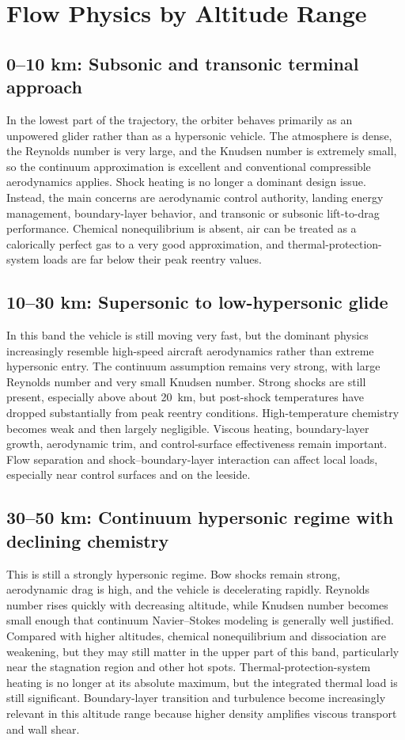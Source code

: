 \documentclass{article}
\begin{document}
\section*{Flow Physics by Altitude Range}

\subsection*{0--10 km: Subsonic and transonic terminal approach}
In the lowest part of the trajectory, the orbiter behaves primarily as an unpowered glider rather than as a hypersonic vehicle. The atmosphere is dense, the Reynolds number is very large, and the Knudsen number is extremely small, so the continuum approximation is excellent and conventional compressible aerodynamics applies. Shock heating is no longer a dominant design issue. Instead, the main concerns are aerodynamic control authority, landing energy management, boundary-layer behavior, and transonic or subsonic lift-to-drag performance. Chemical nonequilibrium is absent, air can be treated as a calorically perfect gas to a very good approximation, and thermal-protection-system loads are far below their peak reentry values.

\subsection*{10--30 km: Supersonic to low-hypersonic glide}
In this band the vehicle is still moving very fast, but the dominant physics increasingly resemble high-speed aircraft aerodynamics rather than extreme hypersonic entry. The continuum assumption remains very strong, with large Reynolds number and very small Knudsen number. Strong shocks are still present, especially above about \SI{20}{km}, but post-shock temperatures have dropped substantially from peak reentry conditions. High-temperature chemistry becomes weak and then largely negligible. Viscous heating, boundary-layer growth, aerodynamic trim, and control-surface effectiveness remain important. Flow separation and shock--boundary-layer interaction can affect local loads, especially near control surfaces and on the leeside.

\subsection*{30--50 km: Continuum hypersonic regime with declining chemistry}
This is still a strongly hypersonic regime. Bow shocks remain strong, aerodynamic drag is high, and the vehicle is decelerating rapidly. Reynolds number rises quickly with decreasing altitude, while Knudsen number becomes small enough that continuum Navier--Stokes modeling is generally well justified. Compared with higher altitudes, chemical nonequilibrium and dissociation are weakening, but they may still matter in the upper part of this band, particularly near the stagnation region and other hot spots. Thermal-protection-system heating is no longer at its absolute maximum, but the integrated thermal load is still significant. Boundary-layer transition and turbulence become increasingly relevant in this altitude range because higher density amplifies viscous transport and wall shear.
\end{document}
